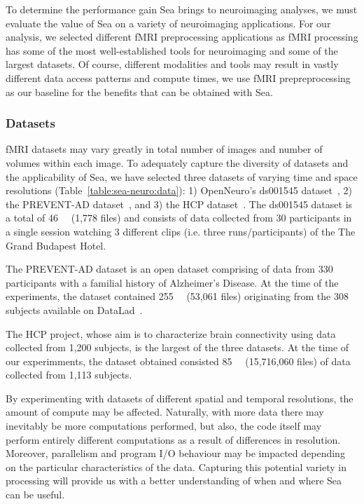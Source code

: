     To determine the performance gain Sea brings to neuroimaging analyses, we must evaluate the value of Sea on a variety of neuroimaging
    applications. For our analysis, we selected different fMRI preprocessing applications as fMRI processing has some of the most
    well-established tools for neuroimaging and some of the largest datasets. Of course, different modalities and tools may result in
    vastly different data access patterns and compute times, we use fMRI prepreprocessing as our baseline for the benefits that can be
    obtained with Sea. 
    
    \subsubsection{Datasets}
    fMRI datasets may vary greatly in total number
    of images and number of volumes within each image. To adequately capture the 
    diversity of datasets and the applicability of Sea, we have selected three datasets of varying
    time and space resolutions (Table~\ref{table:sea-neuro:data}): 1) OpenNeuro's ds001545 dataset~\cite{ds001545},
    2) the PREVENT-AD dataset~\cite{preventad}, and 3) the HCP dataset~\cite{HCP}.
    The ds001545 dataset is a total of \SI{46}{\giga\byte} (1,778 files) and consists of data collected
    from 30 participants in a single session watching 3 different clips (i.e. three runs/participants) of the The Grand Budapest Hotel.
    
    
    The PREVENT-AD dataset is an open dataset comprising of data from 330 participants with a familial history
    of Alzheimer's Disease.
    At the time of the experiments, the dataset contained \SI{255}{\giga\byte} (53,061 files) originating from the 308 subjects available on DataLad~\cite{halchenko2021datalad}.
    
    The HCP project, whose aim is to characterize brain connectivity using data collected from 1,200 subjects, is the largest of the three datasets.
    At the time of our experimments, the dataset obtained consisted \SI{85}{\tera\byte} (15,716,060 files) of data collected from 1,113 subjects.
    
    By experimenting with datasets of different spatial and temporal resolutions, the amount of compute may be affected.
    Naturally, with more data there may inevitably be more computations performed, but also, the code itself may
    perform entirely different computations as a result of differences in resolution. Moreover, parallelism and program I/O behaviour
    may be impacted depending on the particular characteristics of the data. Capturing this potential
    variety in processing will provide us with a better understanding of when and where Sea can be useful.
    
